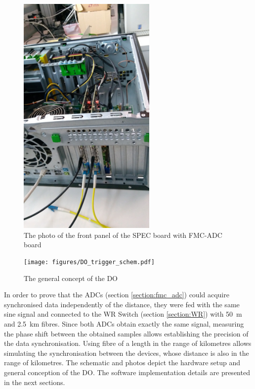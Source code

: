     \begin{figure}
    	\centerline{\includegraphics[width=0.6\textwidth]{figures/DO_SPEC_FMC_front_panel.jpg}}
    	\caption{The photo of the front panel of the SPEC board with FMC-ADC board}
    	\label{fig:DO_SPEC_FMC_front_panel}
    \end{figure}
    \begin{figure}
    	\centerline{\texttt{[image: figures/DO\_trigger\_schem.pdf]}}
    	\caption{The general concept of the DO}
    	\label{fig:DO_concept}
    \end{figure}
    
    In order to prove that the ADCs (section \ref{section:fmc_adc}) could acquire synchronised data independently of the distance, they were fed with the same sine signal and connected to the WR Switch (section \ref{section:WR}) with 50~m and 2.5~km fibres. Since both ADCs obtain exactly the same signal, measuring the phase shift between the obtained samples allows establishing the precision of the data synchronisation. Using fibre of a length in the range of kilometres allows simulating the synchronisation between the devices, whose distance is also in the range of kilometres. The schematic and photos depict the hardware setup and general conception of the DO. The software implementation details are presented in the next sections.


